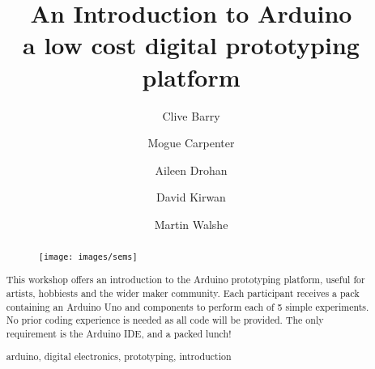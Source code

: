 \documentclass[runningheads,a4paper]{llncs}
\newcommand{\keywords}[1]{\par\addvspace\baselineskip
\noindent\keywordname\enspace\ignorespaces#1}
\begin{document}
\mainmatter  %

\title{An Introduction to Arduino \\a low cost digital prototyping platform}

%

%
%
\author{Clive Barry%
\and Mogue Carpenter \and Aileen Drohan \and David Kirwan \and Martin Walshe}
%

%

%
%
\maketitle

%
\begin{abstract}
\begin{figure}
	\centering
	\texttt{[image: images/sems]}
\end{figure}
This workshop offers an introduction to the Arduino prototyping platform, useful for artists, hobbiests and the wider maker community. Each participant receives a pack containing an Arduino Uno and components to perform each of 5 simple experiments. No prior coding experience is needed as all code will be provided. The only requirement is the Arduino IDE, and a packed lunch!
\keywords{arduino, digital electronics, prototyping, introduction}
\end{abstract}
%
\end{document}
